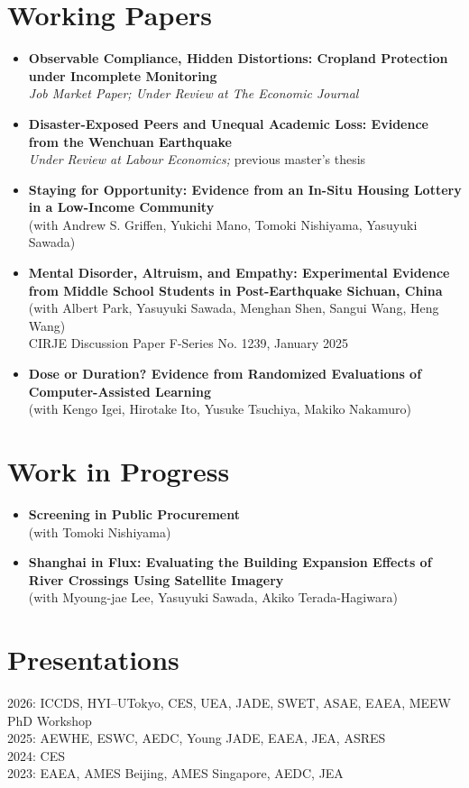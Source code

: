 \documentclass[10pt,a4paper]{article}
\newcommand{\coauthors}[1]{\\[-1pt]{\small (with #1)}}
\newcommand{\paperdetails}[1]{\\[-1pt]{\small #1}}
\begin{document}
\section*{Working Papers}
\begin{itemize}
  \item \textbf{Observable Compliance, Hidden Distortions: Cropland Protection under Incomplete Monitoring}
  \paperdetails{\textit{Job Market Paper; Under Review at The Economic Journal}}

  \item \textbf{Disaster-Exposed Peers and Unequal Academic Loss: Evidence from the Wenchuan Earthquake}
  \paperdetails{\textit{Under Review at Labour Economics;} previous master's thesis}

  \item \textbf{Staying for Opportunity: Evidence from an In-Situ Housing Lottery in a Low-Income Community}
  \coauthors{Andrew S. Griffen, Yukichi Mano, Tomoki Nishiyama, Yasuyuki Sawada}

  \item \textbf{Mental Disorder, Altruism, and Empathy: Experimental Evidence from Middle School Students in Post-Earthquake Sichuan, China}
  \coauthors{Albert Park, Yasuyuki Sawada, Menghan Shen, Sangui Wang, Heng Wang}
  \paperdetails{CIRJE Discussion Paper F-Series No. 1239, January 2025}

  \item \textbf{Dose or Duration? Evidence from Randomized Evaluations of Computer-Assisted Learning}
  \coauthors{Kengo Igei, Hirotake Ito, Yusuke Tsuchiya, Makiko Nakamuro}
\end{itemize}

\section*{Work in Progress}
\begin{itemize}
  \item \textbf{Screening in Public Procurement}
  \coauthors{Tomoki Nishiyama}

  \item \textbf{Shanghai in Flux: Evaluating the Building Expansion Effects of River Crossings Using Satellite Imagery}
  \coauthors{Myoung-jae Lee, Yasuyuki Sawada, Akiko Terada-Hagiwara}
\end{itemize}

\section*{Presentations}
2026: ICCDS, HYI--UTokyo, CES, UEA, JADE, SWET, ASAE, EAEA, MEEW PhD Workshop \\
2025: AEWHE, ESWC, AEDC, Young JADE, EAEA, JEA, ASRES \\
2024: CES \\
2023: EAEA, AMES Beijing, AMES Singapore, AEDC, JEA
\end{document}
